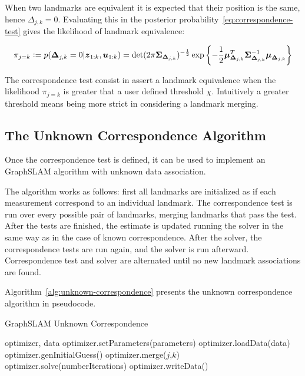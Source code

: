 
When two landmarks are equivalent it is expected that their position is the same, hence $\Delta_{j,k}=0$. Evaluating this in the posterior probability~\eqref{eq:correspondence-test} gives the likelihood of landmark equivalence:

\begin{equation}
\pi_{j=k} \vcentcolon=
p(\boldsymbol{\Delta}_{j,k}=0|\boldsymbol{z}_{1:k},\boldsymbol{u}_{1:k})=
\det(2\pi\boldsymbol{\Sigma}_{\boldsymbol{\Delta}_{j,k}})^{-\frac{1}{2}}
\exp\left\lbrace-\frac{1}{2}\boldsymbol{\mu}_{\boldsymbol{\Delta}_{j,k}}^T\boldsymbol{\Sigma}_{\boldsymbol{\Delta}_{j,k}}^{-1}\boldsymbol{\mu}_{\boldsymbol{\Delta}_{j,k}}\right\rbrace
\label{eq:landmark-equivalence}
\end{equation}

The correspondence test consist in assert a landmark equivalence when the likelihood $\pi_{j=k}$ is greater that a user defined threshold $\chi$. Intuitively a greater threshold means being more strict in considering a landmark merging.

\subsection{The Unknown Correspondence Algorithm}

Once the correspondence test is defined, it can be used to implement an GraphSLAM algorithm with unknown data association. 

The algorithm works as follows: first all landmarks are initialized as if each measurement correspond to an individual landmark. The correspondence test is run over every possible pair of landmarks, merging landmarks that pass the test. After the tests are finished, the estimate is updated running the solver in the same way as in the case of known correspondence. After the solver, the correspondence tests are run again, and the solver is run afterward. Correspondence test and solver are alternated until no new landmark associations are found. 

Algorithm~\ref{alg:unknown-correspondence} presents the unknown correspondence algorithm in pseudocode. 

\begin{algorithm}[htbp!]
    \caption{GraphSLAM Unknown Correspondence}
    \label{alg:unknown-correspondence}
    \begin{algorithmic}[1]
        \Require optimizer, data
        \State optimizer.setParameters(parameters)
        \State optimizer.loadData(data)
        \State optimizer.genInitialGuess()
        \State
                    \State optimizer.merge($j$,$k$) 
                \EndIf 
            \EndFor
            \State optimizer.solve(numberIterations)
        \EndWhile
        \State
        \State optimizer.writeData()
    \end{algorithmic}
\end{algorithm}

